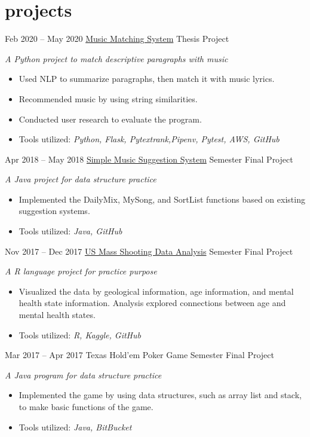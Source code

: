 \documentclass[]{friggeri-cv}
\begin{document}
\section{projects}
\begin{entrylist}
  \entry
    {Feb 2020 -- May 2020}
    {\href{https://github.com/liux2/Allegheny-College-CMPSC-COMP-liux2}{Music Matching System}}
    {Thesis Project}
    {\emph{A Python project to match descriptive paragraphs with music}
    \begin{itemize}[leftmargin=1.2em]
    \item Used NLP to summarize paragraphs, then match it with music lyrics.
    \item Recommended music by using string similarities.
    \item Conducted user research to evaluate the program.
    \item Tools utilized: \emph{Python, Flask, Pytextrank,Pipenv, Pytest, AWS, GitHub}
    \end{itemize}}
    
  \entry
    {Apr 2018 -- May 2018}
    {\href{https://github.com/TravisThomasAC/cs250-FinalProject-Team9}{Simple Music Suggestion System}}
    {Semester Final Project}
    {\emph{A Java project for data structure practice}
    \begin{itemize}[leftmargin=1.2em]
    \item Implemented the DailyMix, MySong, and SortList functions based on existing suggestion systems.
    \item Tools utilized: \emph{Java, GitHub}
    \end{itemize}}

  \entry
    {Nov 2017 -- Dec 2017}
    {\href{https://github.com/liux2/cs390f2017-project}{US Mass Shooting Data Analysis}}
    {Semester Final Project}
    {\emph{A R language project for practice purpose}
    \begin{itemize}[leftmargin=1.2em]
    \item Visualized the data by geological information, age information, and mental health state information. Analysis explored connections between age and mental health states.
    \item Tools utilized: \emph{R, Kaggle, GitHub}
    \end{itemize}}
    
  \entry
    {Mar 2017 -- Apr 2017}
    {Texas Hold’em Poker Game}
    {Semester Final Project}
    {\emph{A Java program for data structure practice}
    \begin{itemize}[leftmargin=1.2em]
    \item Implemented the game by using data structures, such as array list and stack, to make basic functions of the game.
    \item Tools utilized: \emph{Java, BitBucket}
    \end{itemize}}
    
\end{entrylist}
\end{document}
